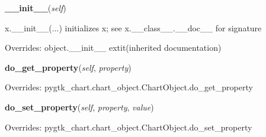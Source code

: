     \vspace{0.5ex}

\hspace{.8\funcindent}\begin{boxedminipage}{\funcwidth}

    \raggedright \textbf{\_\_init\_\_}(\textit{self})

\setlength{\parskip}{2ex}
    x.\_\_init\_\_(...) initializes x; see x.\_\_class\_\_.\_\_doc\_\_ for 
    signature

\setlength{\parskip}{1ex}
      Overrides: object.\_\_init\_\_ 	extit{(inherited documentation)}

    \end{boxedminipage}

    \vspace{0.5ex}

\hspace{.8\funcindent}\begin{boxedminipage}{\funcwidth}

    \raggedright \textbf{do\_get\_property}(\textit{self}, \textit{property})

\setlength{\parskip}{2ex}
\setlength{\parskip}{1ex}
      Overrides: pygtk\_chart.chart\_object.ChartObject.do\_get\_property

    \end{boxedminipage}

    \vspace{0.5ex}

\hspace{.8\funcindent}\begin{boxedminipage}{\funcwidth}

    \raggedright \textbf{do\_set\_property}(\textit{self}, \textit{property}, \textit{value})

\setlength{\parskip}{2ex}
\setlength{\parskip}{1ex}
      Overrides: pygtk\_chart.chart\_object.ChartObject.do\_set\_property

    \end{boxedminipage}

    \label{pygtk_chart:chart:Background:set_color}

    \vspace{0.5ex}


